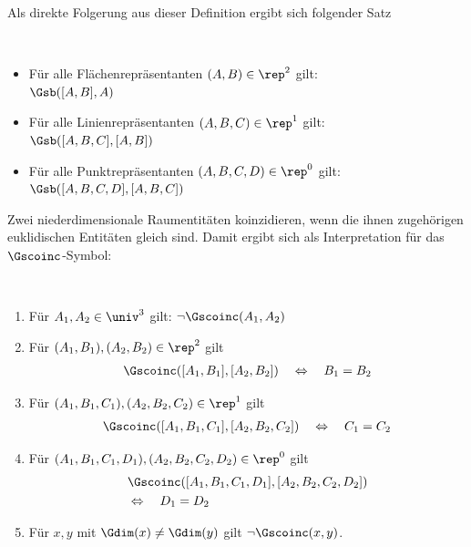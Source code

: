%        
        Als direkte Folgerung aus dieser Definition ergibt sich folgender Satz
%        
        \begin{satz}\label{satz:sb-einfacher-fall}\ \vspace{0pt}
            
            \begin{itemize}
                \item Für alle Flächenrepräsentanten $(A,B) \in \rep^2$ gilt: \\$\Gsb([A,B],A)$
                \item Für alle Linienrepräsentanten $(A,B,C) \in \rep^1$ gilt: \\$\Gsb([A,B,C],[A,B])$
                \item Für alle Punktrepräsentanten $(A,B,C,D) \in \rep^0$ gilt: \\$\Gsb([A,B,C,D],[A,B,C])$
            \end{itemize}
        \end{satz}
%    
        Zwei
        \marginpar{$\Gscoinc$}
        niederdimensionale Raumentitäten koinzidieren, wenn die ihnen zugehörigen euklidischen Entitäten gleich sind. Damit ergibt sich als Interpretation für das $\Gscoinc$-Symbol:
%    
        \begin{dfn}\ \vspace{0pt}

            \begin{enumerate}
                \item Für $A_1, A_2 \in \univ^3$ gilt: $\neg \Gscoinc(A_1,A_2)$
                \item Für $(A_1,B_1), (A_2,B_2) \in \rep^2$ gilt 
                    \begin{align*}
                        \Gscoinc([A_1,B_1],[A_2,B_2]) \quad \Leftrightarrow  \quad B_1 = B_2
                    \end{align*}
                \item Für $(A_1,B_1,C_1), (A_2,B_2,C_2) \in \rep^1$ gilt 
                    \begin{align*}
                        \Gscoinc([A_1,B_1,C_1],[A_2,B_2,C_2]) \quad \Leftrightarrow  \quad C_1 = C_2
                    \end{align*}
                \item Für $(A_1,B_1,C_1,D_1), (A_2,B_2,C_2,D_2) \in \rep^0$ gilt 
                    \begin{align*}
                        &\Gscoinc([A_1,B_1,C_1,D_1],[A_2,B_2,C_2,D_2]) \\
                        &\Leftrightarrow  \quad D_1 = D_2
                    \end{align*}
                \item Für $x, y$ mit $\Gdim(x) \neq \Gdim(y)$ gilt $\neg \Gscoinc(x,y)$.
            \end{enumerate}
            
        \end{dfn}%
